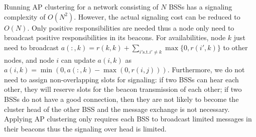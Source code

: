 \documentclass[10pt, conference, letterpaper]{IEEEtran}
\begin{document}


Running AP clustering for a network consisting of $N$ BSSs has a signaling complexity of $O(N^2)$. However, the actual signaling cost can be reduced to $O(N)$. Only positive responsibilities are needed thus a node only need to broadcast positive responsibilities in its beacons. For availabilities, node $k$ just need to broadcast $a(:,k) = r(k,k)+\sum_{i'\text{s.t.}i'\neq k}\max \{0, r(i',k) \}$ to other nodes, and node $i$ can update $a(i,k)$ as $a(i, k) = \min(0,a(:,k) - \max(0, r(i,j)))$. Furthermore, we do not need to assign non-overlapping slots for signaling: if two BSSs can hear each other, they will reserve slots for the beacon transmission of each other; if two BSSs do not have a good connection, then they are not likely to become the cluster head of the other BSS and the message exchange is not necessary. Applying AP clustering only requires each BSS to broadcast limited messages in their beacons thus the signaling over head is limited. 

\end{document}
